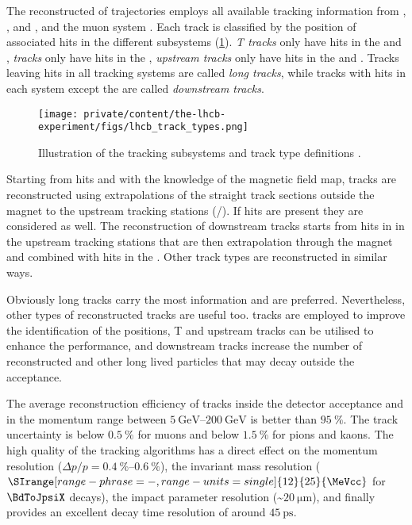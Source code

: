 The reconstructed of trajectories employs all available tracking information
from \VELO, \TT, \IT and \OT, and the muon system \cite{Aaij:2014pwa}. Each
track is classified by the position of associated hits in the different
subsystems
(\cref{fig:lhcb_experiment:tracking:techniques_and_performance:tracktypes}).
\emph{T tracks} only have hits in the \IT and \OT, \emph{\VELO tracks} only have
hits in the
\VELO, \emph{upstream tracks} only have hits in the \VELO and \TT. Tracks
leaving hits in all tracking systems are called \emph{long tracks}, while tracks
with hits in each system except the \VELO are called \emph{downstream tracks}.
%
\begin{figure}[t]
  \texttt{[image: private/content/the-lhcb-experiment/figs/lhcb\_track\_types.png]}
  \caption{
    Illustration of the \LHCb tracking subsystems and track type definitions \cite{Aaij:2014pwa}.
  }
  \label{fig:lhcb_experiment:tracking:techniques_and_performance:tracktypes}
\end{figure}
%
Starting from \VELO hits and with the knowledge of the magnetic field map,
tracks are reconstructed using extrapolations of the straight track sections
outside the magnet to the upstream tracking stations (\IT/\OT). If \TT hits are
present they are considered as well. The reconstruction of downstream tracks
starts from hits in in the upstream tracking stations that are then
extrapolation through the magnet and combined with hits in the \TT. Other track
types are reconstructed in similar ways. 

Obviously long tracks carry the most information and are preferred.
Nevertheless, other types of reconstructed tracks are useful too. \VELO tracks
are employed to improve the identification of the \PV positions, T and upstream
tracks can be utilised to enhance the \RICH performance, and downstream tracks
increase the number of reconstructed \KS and other long lived particles that may
decay outside the \VELO acceptance.

The average reconstruction efficiency of tracks inside the detector acceptance
and in the momentum range between 
$\SIrange[range-phrase = -,range-units = single]{5}{200}{\GeV}$ is better than
$\SI{95}{\percent}$. The track uncertainty is below $\SI{0.5}{\percent}$ for
muons and below $\SI{1.5}{\percent}$ for pions and kaons. The high quality of
the tracking algorithms has a direct effect on the momentum resolution ($\Delta
p/p = \SIrange[range-phrase = -,range-units = single]{0.4}{0.6}{\percent}$), the
invariant mass resolution ($\SIrange[range-phrase = -,range-units =single]{12}{25}{\MeVcc}$ 
for $\BdToJpsiX$ decays), the impact parameter resolution (\sim$\SI{20}{\micro\metre}$), 
and finally provides an excellent decay time resolution of around
$\SI{45}{\ps}$.

